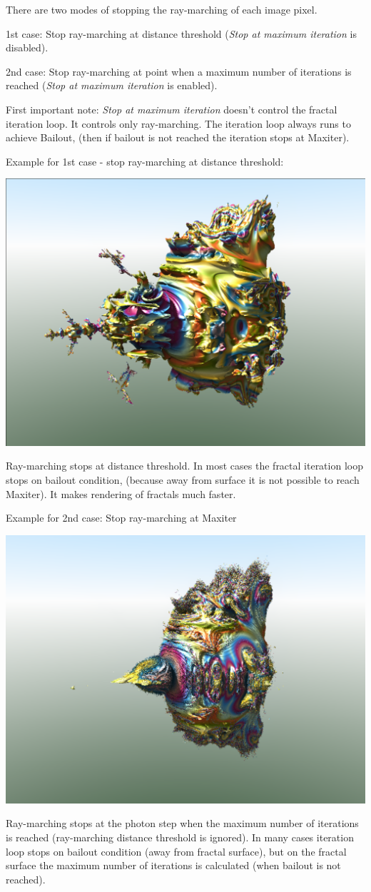 There are two modes of stopping the ray-marching of each image pixel.

1st case: Stop ray-marching at distance threshold (\emph{Stop at maximum
	iteration} is disabled).

2nd case: Stop ray-marching at point when a maximum number of iterations is
reached (\emph{Stop at maximum iteration} is enabled).

First important note: \emph{Stop at maximum iteration} doesn't control the
fractal iteration loop. It controls only ray-marching. The iteration loop always
runs to achieve Bailout, (then if bailout is not reached the iteration stops at
Maxiter).

\begin{samepage} Example for 1st case - stop ray-marching at distance threshold:
	
	\includegraphics[width=0.5\linewidth]{img/manual/media/stop_raymarching_at_disttrhersh}
	
	Ray-marching stops at distance threshold. In most cases the fractal iteration
	loop stops on bailout condition, (because away from surface it is not possible
	to reach Maxiter). It makes rendering of fractals much faster. \end{samepage}

\begin{samepage} Example for 2nd case: Stop ray-marching at Maxiter
	
	\includegraphics[width=0.5\linewidth]{img/manual/media/stop_raymarching_at_maxiter}
	
	Ray-marching stops at the photon step when the maximum number of iterations is
	reached (ray-marching distance threshold is ignored). In many cases iteration
	loop stops on bailout condition (away from fractal surface), but on the fractal
	surface the maximum number of iterations is calculated (when bailout is not
	reached). \end{samepage}

